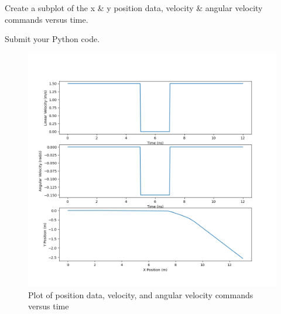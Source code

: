 \documentclass{article}
\begin{document}
\bigskip 
\noindent Create a subplot of the x \& y position data, velocity \& angular velocity commands versus time. 

\bigskip
\noindent Submit your Python code.

\begin{figure}[H]
  \centering
  \includegraphics[width=\textwidth]{question3.png}
  \caption*{Plot of position data, velocity, and angular velocity commands versus time}
\end{figure}
\end{document}
